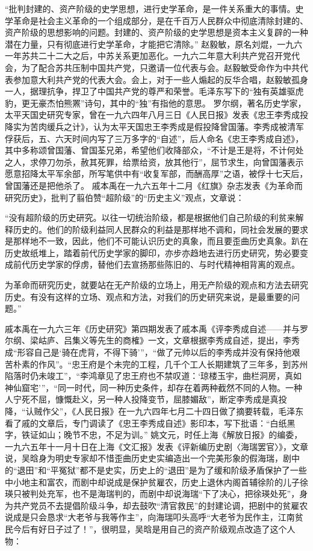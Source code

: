 \begin{maonote}
“批判封建的、资产阶级的史学思想，进行史学革命，是一件关系重大的事情。史学革命是社会主义革命的一个组成部分，是在千百万人民群众中彻底清除封建的、资产阶级的思想影响的问题。封建的、资产阶级的史学思想是资本主义复辟的一种潜在力量，只有彻底进行史学革命，才能把它清除。”
赵毅敏，原名刘焜，一九六一年苏共二十二大之后，中苏关系更加恶化。一九六二年意大利共产党召开党代会，为了配合苏共压制中国共产党，只邀请一位代表与会。赵毅敏受命作为中共代表参加意大利共产党的代表大会。会上，对于一些人煽起的反华合唱，赵毅敏孤身一人，据理抗争，捍卫了中国共产党的尊严和荣誉。毛泽东写下的“独有英雄驱虎豹，更无豪杰怕熊罴”诗句，其中的“独”有指他的意思。
罗尔纲，著名历史学家，太平天国史研究专家，曾在一九六四年八月三日《人民日报》发表《忠王李秀成投降实为苦肉缓兵之计》，认为太平天国忠王李秀成是假投降曾国藩。李秀成被清军俘获后，五、六天时间内写了三万多字的“自述”，后人命名《忠王李秀成自述》，其中多称颂曾国藩、曾国荃兄弟，希望他们收降部众，“不计是王是将，不计何处之人，求停刀勿杀，赦其死罪，给票给资，放其他行”，屈节求生，向曾国藩表示愿意招降太平军余部，所写笔供中有“收复军部，而酬高厚”之语，被俘十七天后，曾国藩还是把他杀了。
戚本禹在一九六五年十二月《红旗》杂志发表《为革命而研究历史》，批判了翦伯赞“超阶级”的“历史主义”观点，文章说：

“没有超阶级的历史研究。以往一切统治阶级，都是根据他们自己阶级的利贫来解释历史的。他们的阶级利益同人民群众的利益是那样地不调和，同社会发展的要求是那样地不一致，因此，他们不可能认识历史的真象，而且要歪曲历史真象。趴在历史故纸堆上，踏着前代历史学家的脚印，亦步亦趋地去进行历史研究，势必要变成前代历史学家的俘虏，替他们去宣扬那些陈旧的、与时代精神相背离的观点。

为革命而研究历史，就要站在无产阶级的立场上，用无产阶级的观点和方法去研究历史。有没有这样的立场、观点和方法，对我们的历史研究来说，是最重要的问题。”

戚本禹在一九六三年《历史研究》第四期发表了戚本禹《评李秀成自述——并与罗尔纲、梁岵庐、吕集义等先生的商榷》一文，文章根据李秀成自述，提出，李秀成“形容自己是‘骑在虎背，不得下骑’”，“做了元帅以后的李秀成并没有保持他艰苦朴素的作风”。“忠王府是个未完的工程，几千个工人长期建筑了三年多，到苏州陷落时仍未竣工”，“李鸿章见了忠王府也不禁叹道：‘琼楼玉宇，曲栏洞房，真如神仙窟宅’”，“同一时代，同一种历史条件，却存在着两种截然不同的人物。一种人宁死不屈，慷慨赴义，另一种人投降变节，屈膝媚敌”，断定李秀成是真投降，“认贼作父”，《人民日报》在一九六四年七月二十四日做了摘要转载，毛泽东看了戚的文章后，专门调读了《忠王李秀成自述》影印本，写下批语：“白纸黑字，铁证如山；晚节不忠，不足为训。”
姚文元，时任上海《解放日报》的编委，一九六五年十一月十日在上海《文汇报》发表《评新编历史剧〈海瑞罢官〉》，文章说，吴晗身为明史专家却不惜歪曲历史史实编造出一个完美形象的假海瑞，剧中的“退田”和“平冤狱”都不是史实，历史上的“退田”是为了缓和阶级矛盾保护了一些中小地主和富农，而剧中却说成是保护贫雇农，历史上退休内阁首辅徐阶的儿子徐瑛只被判处充军，也不是海瑞判的，而剧中却说海瑞“下了决心，把徐瑛处死”，身为共产党员不去提倡阶级斗争，却去鼓吹“清官救民”的封建论调，把剧中的贫雇农说成是只会恳求“大老爷与我等作主”，向海瑞叩头高呼“大老爷为民作主，江南贫民今后有好日子过了！”，很明显，吴晗是用自己的资产阶级观点改造了这个人物：


\end{maonote}
